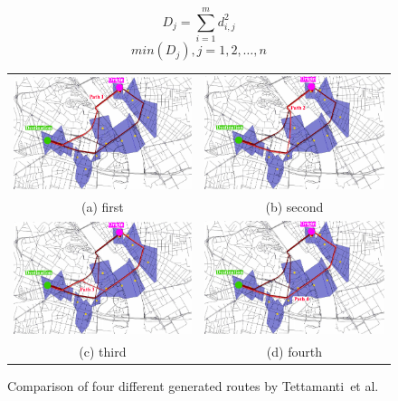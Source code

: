\begin{equation}
\label{eq:sumsquare}
D_j=\sum_{i=1}^{m} d_{i,j}^{2}
\end{equation}
\begin{equation}
\label{eq:minsum}
min(D_j), j = 1,2,\ldots,n
\end{equation}
\begin{figure}
\begin{tabular}{cc}
  \includegraphics[width=65mm]{./images/tattipath0.pdf} 
  &   \includegraphics[width=65mm]{./images/tattipath1.pdf} \\
(a) first & (b) second \\[6pt]
 \includegraphics[width=65mm]{./images/tattipath2.pdf} 
 &   \includegraphics[width=65mm]{./images/tattipath3.pdf} \\
(c) third & (d) fourth \\[6pt]
\end{tabular}
\caption{Comparison of four different generated routes by Tettamanti~et al.\ \cite{Tettamanti2012}}
\label{fig:tettaroutes}
\end{figure}

